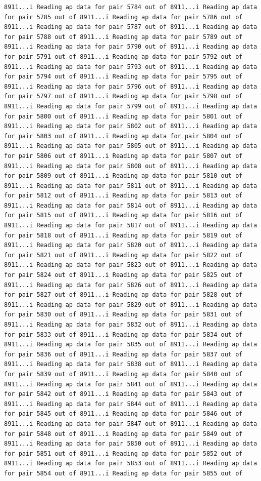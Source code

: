 \documentclass[
]{article}
\begin{document}
\begin{verbatim}
8911...i Reading ap data for pair 5784 out of 8911...i Reading ap data for pair 5785 out of 8911...i Reading ap data for pair 5786 out of 8911...i Reading ap data for pair 5787 out of 8911...i Reading ap data for pair 5788 out of 8911...i Reading ap data for pair 5789 out of 8911...i Reading ap data for pair 5790 out of 8911...i Reading ap data for pair 5791 out of 8911...i Reading ap data for pair 5792 out of 8911...i Reading ap data for pair 5793 out of 8911...i Reading ap data for pair 5794 out of 8911...i Reading ap data for pair 5795 out of 8911...i Reading ap data for pair 5796 out of 8911...i Reading ap data for pair 5797 out of 8911...i Reading ap data for pair 5798 out of 8911...i Reading ap data for pair 5799 out of 8911...i Reading ap data for pair 5800 out of 8911...i Reading ap data for pair 5801 out of 8911...i Reading ap data for pair 5802 out of 8911...i Reading ap data for pair 5803 out of 8911...i Reading ap data for pair 5804 out of 8911...i Reading ap data for pair 5805 out of 8911...i Reading ap data for pair 5806 out of 8911...i Reading ap data for pair 5807 out of 8911...i Reading ap data for pair 5808 out of 8911...i Reading ap data for pair 5809 out of 8911...i Reading ap data for pair 5810 out of 8911...i Reading ap data for pair 5811 out of 8911...i Reading ap data for pair 5812 out of 8911...i Reading ap data for pair 5813 out of 8911...i Reading ap data for pair 5814 out of 8911...i Reading ap data for pair 5815 out of 8911...i Reading ap data for pair 5816 out of 8911...i Reading ap data for pair 5817 out of 8911...i Reading ap data for pair 5818 out of 8911...i Reading ap data for pair 5819 out of 8911...i Reading ap data for pair 5820 out of 8911...i Reading ap data for pair 5821 out of 8911...i Reading ap data for pair 5822 out of 8911...i Reading ap data for pair 5823 out of 8911...i Reading ap data for pair 5824 out of 8911...i Reading ap data for pair 5825 out of 8911...i Reading ap data for pair 5826 out of 8911...i Reading ap data for pair 5827 out of 8911...i Reading ap data for pair 5828 out of 8911...i Reading ap data for pair 5829 out of 8911...i Reading ap data for pair 5830 out of 8911...i Reading ap data for pair 5831 out of 8911...i Reading ap data for pair 5832 out of 8911...i Reading ap data for pair 5833 out of 8911...i Reading ap data for pair 5834 out of 8911...i Reading ap data for pair 5835 out of 8911...i Reading ap data for pair 5836 out of 8911...i Reading ap data for pair 5837 out of 8911...i Reading ap data for pair 5838 out of 8911...i Reading ap data for pair 5839 out of 8911...i Reading ap data for pair 5840 out of 8911...i Reading ap data for pair 5841 out of 8911...i Reading ap data for pair 5842 out of 8911...i Reading ap data for pair 5843 out of 8911...i Reading ap data for pair 5844 out of 8911...i Reading ap data for pair 5845 out of 8911...i Reading ap data for pair 5846 out of 8911...i Reading ap data for pair 5847 out of 8911...i Reading ap data for pair 5848 out of 8911...i Reading ap data for pair 5849 out of 8911...i Reading ap data for pair 5850 out of 8911...i Reading ap data for pair 5851 out of 8911...i Reading ap data for pair 5852 out of 8911...i Reading ap data for pair 5853 out of 8911...i Reading ap data for pair 5854 out of 8911...i Reading ap data for pair 5855 out of 
\end{verbatim}
\end{document}
